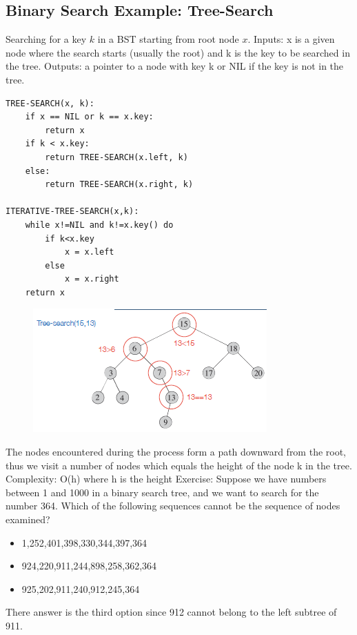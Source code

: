 \subsection{Binary Search Example: Tree-Search}
Searching for a key \( k \) in a BST starting from root node \( x \). Inputs: x is a given node where the search starts (usually the root) and k is the key to be searched in the tree. Outputs: a pointer to a node with key k or NIL if the key is not in the tree.

\begin{verbatim}
TREE-SEARCH(x, k):
    if x == NIL or k == x.key:
        return x
    if k < x.key:
        return TREE-SEARCH(x.left, k)
    else:
        return TREE-SEARCH(x.right, k)

ITERATIVE-TREE-SEARCH(x,k):
    while x!=NIL and k!=x.key() do
        if k<x.key
            x = x.left
        else
            x = x.right
    return x
\end{verbatim}

\begin{figure}[h!]
    \centering
    \includegraphics[width=0.75\linewidth]{immagini/tree7.png}
\end{figure}
The nodes encountered during the process form a path downward from the root, thus we visit a number of nodes which equals the height of the node k in the tree. Complexity: O(h) where h is the height
\newpage Exercise: Suppose we have numbers between 1 and 1000 in a binary search tree, and we want to search for the number 364. Which of the following sequences cannot be the sequence of nodes examined?
\begin{itemize}
    \item 1,252,401,398,330,344,397,364
    \item 924,220,911,244,898,258,362,364
    \item 925,202,911,240,912,245,364
\end{itemize}
There answer is the third option since 912 cannot belong to the left subtree of 911.

